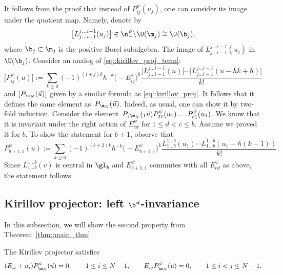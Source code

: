 	\begin{Remark}
		\label{rmk::kirillov_proj_image_quot}
		It follows from the proof that instead of $P_{ij}^{\psi}(u_j)$, one can consider its image under the quotient map. Namely, denote by
		\[
		\bigl[L_{j \dots i-1}^{j \dots i-1}(u_j)\bigr] \in \n_-^{\psi} \backslash \U(\m_j) \cong \U(\b_j),
		\]
		where $\b_j \subset \m_j$ is the positive Borel subalgebra. The image of $L_{j \dots i-1}^{j \dots i-1}(u_j)$ in $\U(\b_j)$. Consider an analog of \eqref{eq::kirillov_proj_term}:
		\begin{equation*}
			\bigl[P^{\psi}_{ij}(u)\bigr] := \sum\limits_{k\geq 0} (-1)^{(i+j)k} \hbar^{-k} \bigl(-E_{ij}^{\psi}\bigr)^k \frac{\bigl[L_{j\dots i-1}^{j \dots i-1}(u)\bigr] \cdots \bigl[L_{j\dots i-1}^{j \dots i-1}(u - \hbar k+\hbar)\bigr]}{k!}
		\end{equation*}
		and $[P_{\m_N}(\vec{u})]$ given by a similar formula as \eqref{eq::kirillov_proj}. It follows that it defines the same element as~$P_{\m_N}(\vec{u})$. Indeed, as usual, one can show it by two-fold induction. Consider the element~${
		P_{{}_1\m_N}({}_1\vec{u}) P_{21}^{\psi}(u_1) \dots P_{b1}^{\psi}(u_1)}$.
		We know that it is invariant under the right action of $E_{cd}^{\psi}$ for $1\leq d < c \leq b$. Assume we proved it for $b$. To show the statement for $b+1$, observe that
		\[
		P^{\psi}_{b+1,1}(u) := \sum\limits_{k\geq 0} (-1)^{(b+2)k} \hbar^{-k} \bigl(-E_{b+1,1}^{\psi}\bigr)^k \frac{L_{1\dots b}^{1 \dots b}(u_1) \cdots L_{1\dots b}^{1 \dots b}(u_1 - \hbar(k-1))}{k!}.
		\]
		Since $L_{1\dots b}^{1\dots b}(v)$ is central in $\gl_b$ and $E_{b+1,1}^{\psi}$ commutes with all $E_{cd}^{\psi}$ as above, the statement follows.
	\end{Remark}
	
	\subsection[Kirillov projector: left b-invariance]{Kirillov projector: left $\boldsymbol{\b^{\vec{u}}}$-invariance}
	
	In this subsection, we will show the second property from Theorem~\ref{thm::main_thm}.
	\begin{Theorem}
		\label{thm::proj_left_inv}
		The Kirillov projector satisfies
		\begin{gather*}
				(E_{ii} + u_i) P_{\m_N}^{\psi}(\vec{u}) = 0,\qquad 1\leq i \leq N-1, \qquad
				E_{ij} P_{\m_N}^{\psi}(\vec{u}) =0,\qquad 1 \leq i < j \leq N-1.
		\end{gather*}
	\end{Theorem}
	
